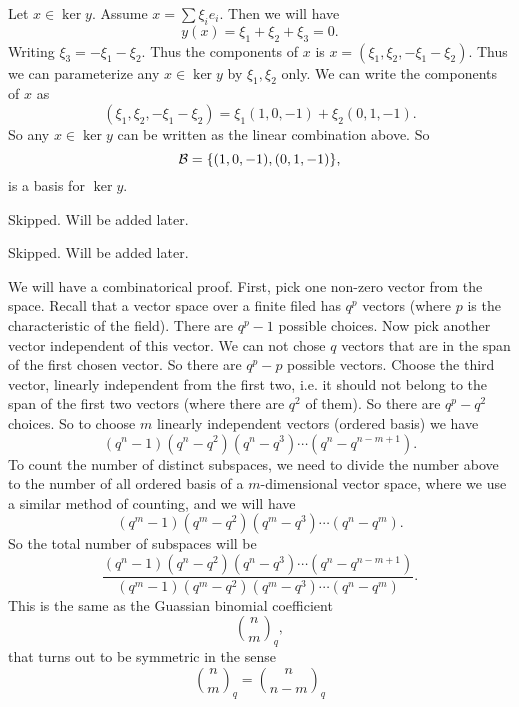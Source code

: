\begin{problem}
	\begin{solution}
		Let $ x\in \ker y $. Assume $ x = \sum \xi_i e_i $. Then we will have
		\[ y(x) = \xi_1 + \xi_2 + \xi_3 = 0. \]
		Writing $ \xi_3 = -\xi_1 - \xi_2 $. Thus the components of $ x $ is $ x = (\xi_1,\xi_2,-\xi_1-\xi_2) $. Thus we can parameterize any $ x\in \ker y $ by $ \xi_1,\xi_2 $ only. We can write the components of $ x $ as
		\[ (\xi_1,\xi_2,-\xi_1-\xi_2) = \xi_1(1,0,-1) + \xi_2(0,1,-1).  \]
		So any $ x \in \ker y $ can be written as the linear combination above. So
		\[ \mathcal{B} = \{(1,0,-1),(0,1,-1)\}, \]
		is a basis for $ \ker y $.
	\end{solution}
\end{problem}

\begin{problem} %
	{\color{red} \noindent Skipped. Will be added later}.
\end{problem}

\begin{problem} %
	{\color{red} \noindent Skipped. Will be added later}.
\end{problem}

\begin{problem} %
	\begin{solution}
		We will have a combinatorical proof. First, pick one non-zero vector from the space. Recall that a vector space over a finite filed has $ q^p $ vectors (where $ p $ is the characteristic of the field).  There are $ q^p - 1 $ possible choices. Now pick another vector independent of this vector. We can not chose $ q $ vectors that are in the span of the first chosen vector. So there are $ q^p - p $ possible vectors. Choose the third vector, linearly independent from the first two, i.e. it should not belong to the span of the first two vectors (where there are $ q^2 $ of them). So there are $ q^p - q^2 $ choices. So to choose $ m $ linearly independent vectors (ordered basis) we have
		\[ (q^n-1)(q^n-q^2)(q^n-q^3)\cdots(q^n-q^{n-m+1}). \]
		To count the number of distinct subspaces, we need to divide the number above to the number of all ordered basis of a $ m $-dimensional vector space, where we use a similar method of counting, and we will have
		\[ (q^m-1)(q^m-q^2)(q^m-q^3)\cdots(q^n-q^m). \]
		So the total number of subspaces will be
		\[ \frac{ (q^n-1)(q^n-q^2)(q^n-q^3)\cdots(q^n-q^{n-m+1})}{(q^m-1)(q^m-q^2)(q^m-q^3)\cdots(q^n-q^m)}. \]
		This is the same as the Guassian binomial coefficient
		\[ \binom{n}{m}_q, \]
		that turns out to be symmetric in the sense
		\[ \binom{n}{m}_q = \binom{n}{n-m}_q \]
	\end{solution}
	
\end{problem}

